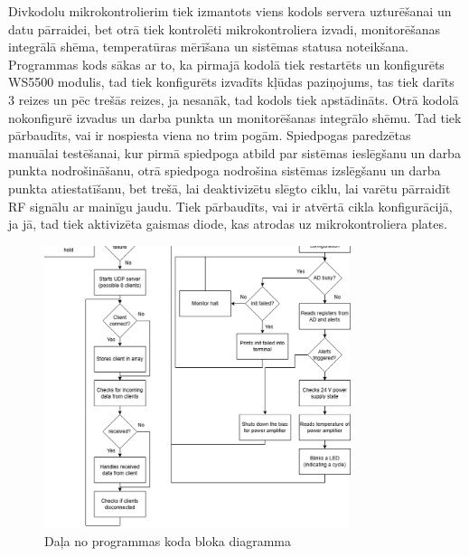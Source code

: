 Divkodolu mikrokontrolierim tiek izmantots viens kodols servera uzturēšanai un datu pārraidei, bet otrā tiek kontrolēti mikrokontroliera izvadi, monitorēšanas integrālā shēma, temperatūras mērīšana un sistēmas statusa noteikšana. Programmas kods sākas ar to, ka pirmajā kodolā tiek restartēts un konfigurēts WS5500 modulis, tad tiek konfigurēts izvadīts kļūdas paziņojums, tas tiek darīts 3 reizes un pēc trešās reizes, ja nesanāk, tad kodols tiek apstādināts. Otrā kodolā nokonfigurē izvadus un darba punkta un monitorēšanas integrālo shēmu. Tad tiek pārbaudīts, vai ir nospiesta viena no trim pogām. Spiedpogas paredzētas manuālai testēšanai, kur pirmā spiedpoga atbild par sistēmas ieslēgšanu un darba punkta nodrošināšanu, otrā spiedpoga nodrošina sistēmas izslēgšanu un darba punkta atiestatīšanu, bet trešā, lai deaktivizētu slēgto ciklu, lai varētu pārraidīt RF signālu ar mainīgu jaudu. Tiek pārbaudīts, vai ir atvērtā cikla konfigurācijā, ja jā, tad tiek aktivizēta gaismas diode, kas atrodas uz mikrokontroliera plates.
\begin{figure}[H]
	\centering
    \includegraphics[width=0.8\textwidth]{pictures/prog_code_2.png}\hspace{1cm}
    \caption{Daļa no programmas koda bloka diagramma}
\end{figure}
